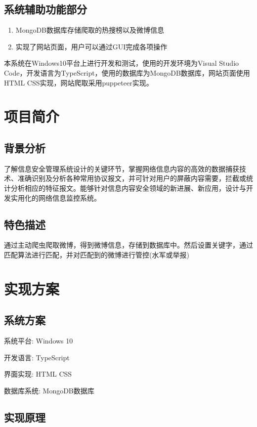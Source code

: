 \documentclass{ctexart}
\begin{document}
\subsection{系统辅助功能部分}
\begin{enumerate}
    \item MongoDB数据库存储爬取的热搜榜以及微博信息
    \item 实现了网站页面，用户可以通过GUI完成各项操作
\end{enumerate}

本系统在Windows10平台上进行开发和测试，使用的开发环境为Visual Studio Code，开发语言为TypeScript，使用的数据库为MongoDB数据库，网站页面使用HTML CSS实现，网站爬取采用puppeteer实现。
\section{项目简介}


\subsection{背景分析}
了解信息安全管理系统设计的关键环节，掌握网络信息内容的高效的数据捕获技术、准确识别及分析各种常用协议报文，并可针对用户的屏蔽内容需要，拦截或统计分析相应的特征报文。能够针对信息内容安全领域的新进展、新应用，设计与开发实用化的网络信息监控系统。
\subsection{特色描述}
通过主动爬虫爬取微博，得到微博信息，存储到数据库中。然后设置关键字，通过匹配算法进行匹配，并对匹配到的微博进行管控(水军或举报)

\section{实现方案}

\subsection{系统方案}

系统平台: Windows 10

开发语言: TypeScript

界面实现: HTML CSS

数据库系统: MongoDB数据库

\subsection{实现原理}
\end{document}

